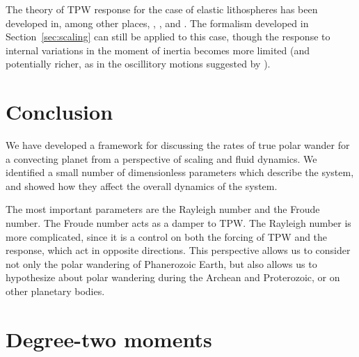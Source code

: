 \documentclass[extra,mreferee]{gji}
\begin{document}
The theory of TPW response for the case of elastic lithospheres has been developed in, among other places, 
\citet{matsuyama2006rotational}, \citet{creveling2012mechanisms}, and \citet{chan2014time}.
The formalism developed in Section~\ref{sec:scaling} can still be applied to this case, 
though the response to internal variations in the moment of inertia becomes more limited 
(and potentially richer, as in the oscillitory motions suggested by \citet{creveling2012mechanisms}).

\section{Conclusion}
We have developed a framework for discussing the rates of true polar wander for a convecting planet 
from a perspective of scaling and fluid dynamics.
We identified a small number of dimensionless parameters which describe the system, and showed how they affect the overall dynamics of the system.

The most important parameters are the Rayleigh number and the Froude number.
The Froude number acts as a damper to TPW.
The Rayleigh number is more complicated, since it is a control on both the forcing 
of TPW and the response, which act in opposite directions.
This perspective allows us to consider not only the polar wandering of Phanerozoic Earth,
but also allows us to hypothesize about polar wandering during the Archean and Proterozoic, or 
on other planetary bodies.

\begin{acknowledgments}
\end{acknowledgments}





\appendix

\section{Degree-two moments}
\label{appendix:moments}
\end{document}
